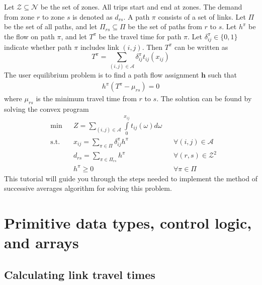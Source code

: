 \documentclass[12pt]{article}
\newcommand{\N}{\mathcal{N}}
\newcommand{\A}{\mathcal{A}}
\newcommand{\Z}{\mathcal{Z}}
\begin{document}
Let $\Z\subseteq\N$ be the set of zones. All trips start and end at zones. The demand from zone $r$ to zone $s$ is denoted as $d_{rs}$. A path $\pi$ consists of a set of links. Let $\Pi$ be the set of all paths, and let $\Pi_{rs}\subseteq\Pi$ be the set of paths from $r$ to $s$. Let $h^\pi$ be the flow on path $\pi$, and let $T^\pi$ be the travel time for path $\pi$. Let $\delta^\pi_{ij}\in\{0,1\}$ indicate whether path $\pi$ includes link $(i,j)$. Then $T^\pi$ can be written as
\begin{equation}
	T^\pi = \sum\limits_{(i,j)\in\A} \delta^\pi_{ij} t_{ij}(x_{ij})
\end{equation}
The user equilibrium problem is to find a path flow assignment $\mathbf{h}$ such that
\begin{align}
	h^\pi \left(T^\pi - \mu_{rs}\right) = 0
\end{align}
where $\mu_{rs}$ is the minimum travel time from $r$ to $s$. The solution can be found by solving the convex program
\begin{subequations}
\begin{align}
	& \min && Z=\sum\limits_{(i,j)\in\A} \int\limits_{0}^{x_{ij}} t_{ij}(\omega) d\omega && \\
	& \mathrm{s.t.} && x_{ij} = \sum\limits_{\pi \in \Pi} \delta^\pi_{ij} h^\pi && \forall (i,j)\in\A\\
	& && d_{rs} = \sum\limits_{\pi\in\Pi_{rs}} h^\pi && \forall (r,s)\in\Z^2\\
	& && h^\pi \geq 0 && \forall \pi\in\Pi 
\end{align}
\end{subequations}
This tutorial will guide you through the steps needed to implement the method of successive averages algorithm for solving this problem.






\section{Primitive data types, control logic, and arrays}

\subsection{Calculating link travel times}
\label{sec21}
\end{document}
